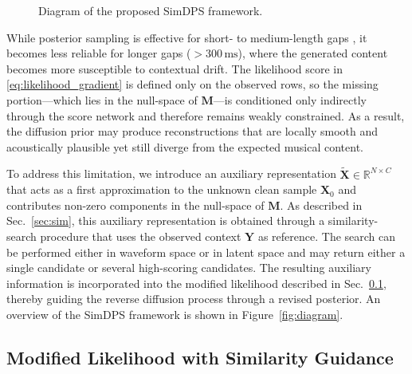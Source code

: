 \documentclass{article}
\begin{document}
\begin{figure}[t]
    \centering
     \resizebox{0.9\columnwidth}{!}{
    \hspace{-20pt}
    }
    \vspace{-10pt}
    \caption{Diagram of the proposed SimDPS framework.
    \vspace{-40pt}
    }
    \label{fig:diagram}
    \label{fig:placeholder}
\end{figure}

While posterior sampling is effective for short- to medium-length gaps \cite{moliner_diffusion-based_2024}, it becomes less reliable for longer gaps ($>300\,\mathrm{ms}$), where the generated content becomes more susceptible to contextual drift.
The likelihood score in \eqref{eq:likelihood_gradient} is defined only on the observed rows, so the missing portion---which lies in the null-space of $\mathbf{M}$---is conditioned only indirectly through the score network and therefore remains weakly constrained.
As a result, the diffusion prior may produce reconstructions that are locally smooth and acoustically plausible yet still diverge from the expected musical content.

To address this limitation, we introduce an auxiliary representation $\tilde{\mathbf{X}} \in \mathbb{R}^{N \times C}$ that acts as a first approximation to the unknown clean sample $\mathbf{X}_0$ and contributes non-zero components in the null-space of $\mathbf{M}$.
As described in Sec.~\ref{sec:sim}, this auxiliary representation is obtained through a similarity-search procedure that uses the observed context $\mathbf{Y}$ as reference.
The search can be performed either in waveform space or in latent space and may return either a single candidate or several high-scoring candidates.
The resulting auxiliary information is incorporated into the modified likelihood described in Sec.~\ref{sec:unilik}, thereby guiding the reverse diffusion process through a revised posterior.
An overview of the SimDPS framework is shown in Figure~\ref{fig:diagram}.


\vspace{-3pt}
\subsection{Modified Likelihood with Similarity Guidance}
\label{sec:unilik}
\vspace{-2pt}
\end{document}
